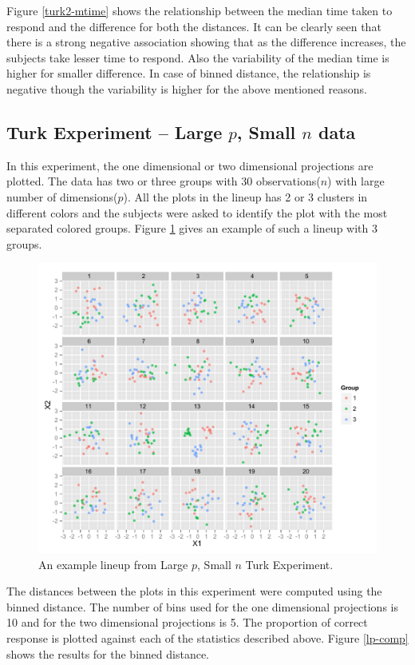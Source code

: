 \documentclass[12]{article}
\begin{document}
Figure \ref{turk2-mtime} shows the relationship between the median time taken to respond and the difference for both the distances. It can be clearly seen that there is a strong negative association showing that as the difference increases, the subjects take lesser time to respond. Also the variability of the median time is higher for smaller difference. In case of binned distance, the relationship is negative though the variability is higher for the above mentioned reasons.

\subsection{Turk Experiment -- Large $p$, Small $n$ data}

In this experiment, the one dimensional or two dimensional projections are plotted. The data has two or three groups with 30 observations($n$) with large number of dimensions($p$). All the plots in the lineup has 2 or 3 clusters in different colors and the subjects were asked to identify the plot with the most separated colored groups. Figure \ref{largep} gives an example of such a lineup with 3 groups. 

\begin{figure}[htbp]
\centering
\includegraphics[width=.7\textwidth]{largep-example.pdf}
\caption{An example lineup from Large $p$, Small $n$ Turk Experiment.}
\label{largep}
\end{figure}

The distances between the plots in this experiment were computed using the binned distance. The number of bins used for the one dimensional projections is 10 and for the two dimensional projections is 5. The proportion of correct response is plotted against each of the statistics described above. Figure \ref{lp-comp} shows the results for the binned distance.
\end{document}
